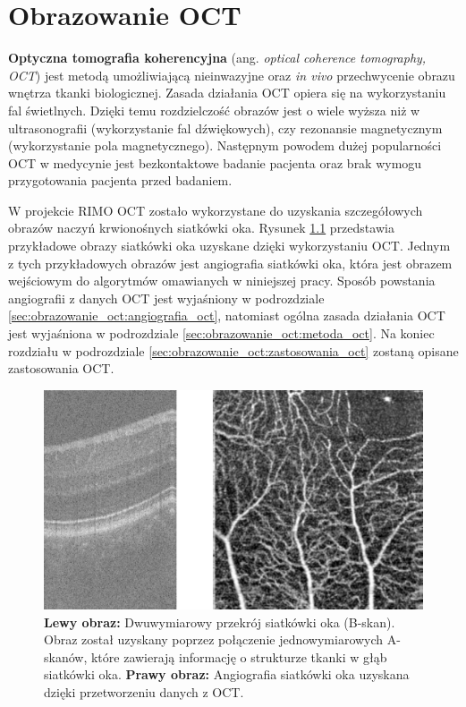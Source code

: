 %
\chapter{Obrazowanie OCT}
\label{sec:obrazowanie_oct}


\textbf{Optyczna tomografia koherencyjna} (ang. \textit{optical coherence tomography, OCT}) jest metodą umożliwiającą nieinwazyjne oraz \textit{in vivo} przechwycenie obrazu wnętrza tkanki biologicznej. Zasada działania OCT opiera się na wykorzystaniu fal świetlnych. Dzięki temu rozdzielczość obrazów jest o wiele wyższa niż w ultrasonografii (wykorzystanie fal dźwiękowych), czy rezonansie magnetycznym (wykorzystanie pola magnetycznego). Następnym powodem dużej popularności OCT w medycynie jest bezkontaktowe badanie pacjenta oraz brak wymogu przygotowania pacjenta przed badaniem. 

W projekcie RIMO OCT zostało wykorzystane do uzyskania szczegółowych obrazów naczyń krwionośnych siatkówki oka. Rysunek \ref{fig:obrazowanie_oct:bscan_vessels} przedstawia przykładowe obrazy siatkówki oka uzyskane dzięki wykorzystaniu OCT. Jednym z tych przykładowych obrazów jest angiografia siatkówki oka, która jest obrazem wejściowym do algorytmów omawianych w niniejszej pracy. Sposób powstania angiografii z danych OCT jest wyjaśniony w podrozdziale \ref{sec:obrazowanie_oct:angiografia_oct}, natomiast ogólna zasada działania OCT jest wyjaśniona w podrozdziale \ref{sec:obrazowanie_oct:metoda_oct}. Na koniec rozdziału w podrozdziale \ref{sec:obrazowanie_oct:zastosowania_oct} zostaną opisane zastosowania OCT.

\begin{figure}[htb]
	\centering
	\includegraphics[width=\textwidth]{gfx/bscan_vessels}
	\caption{\textbf{Lewy obraz:} Dwuwymiarowy przekrój siatkówki oka (B-skan). Obraz został uzyskany poprzez połączenie jednowymiarowych A-skanów, które zawierają informację o strukturze tkanki w głąb siatkówki oka. \textbf{Prawy obraz:} Angiografia siatkówki oka uzyskana dzięki przetworzeniu danych z OCT.}
	\label{fig:obrazowanie_oct:bscan_vessels}
\end{figure}

